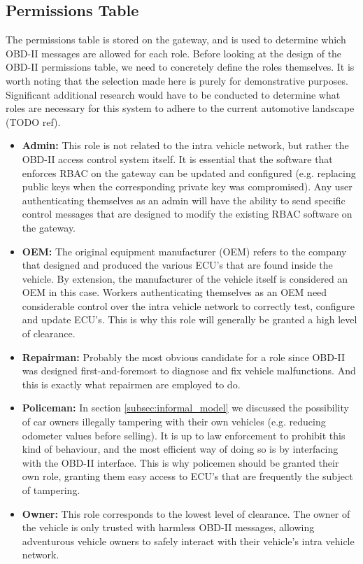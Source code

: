 \subsection{Permissions Table} 
\label{subsec:sol_permissions_table}
The permissions table is stored on the gateway, and is used to determine which OBD-II messages are allowed for each role. Before looking at the design of the OBD-II permissions table, we need to concretely define the roles themselves. It is worth noting that the selection made here is purely for demonstrative purposes. Significant additional research would have to be conducted to determine what roles are necessary for this system to adhere to the current automotive landscape (TODO ref).

\begin{itemize}
	\item \textbf{Admin:} This role is not related to the intra vehicle network, but rather the OBD-II access control system itself. It is essential that the software that enforces RBAC on the gateway can be updated and configured (e.g. replacing public keys when the corresponding private key was compromised). Any user authenticating themselves as an admin will have the ability to send specific control messages that are designed to modify the existing RBAC software on the gateway.
	
	\item \textbf{OEM:} The original equipment manufacturer (OEM) refers to the company that designed and produced the various ECU's that are found inside the vehicle. By extension, the manufacturer of the vehicle itself is considered an OEM in this case. Workers authenticating themselves as an OEM need considerable control over the intra vehicle network to correctly test, configure and update ECU's. This is why this role will generally be granted a high level of clearance.
	
	\item \textbf{Repairman:} Probably the most obvious candidate for a role since OBD-II was designed first-and-foremost to diagnose and fix vehicle malfunctions. And this is exactly what repairmen are employed to do.
	
	\item \textbf{Policeman:} In section \ref{subsec:informal_model} we discussed the possibility of car owners illegally tampering with their own vehicles (e.g. reducing odometer values before selling). It is up to law enforcement to prohibit this kind of behaviour, and the most efficient way of doing so is by interfacing with the OBD-II interface. This is why policemen should be granted their own role, granting them easy access to ECU's that are frequently the subject of tampering.
	
	\item \textbf{Owner:} This role corresponds to the lowest level of clearance. The owner of the vehicle is only trusted with harmless OBD-II messages, allowing adventurous vehicle owners to safely interact with their vehicle's intra vehicle network.
\end{itemize}
